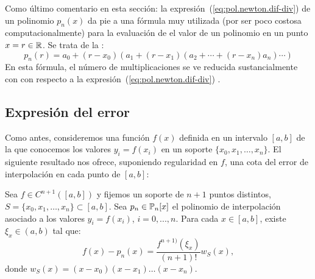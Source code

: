 Como último comentario en esta sección: la
expresión~(\ref{eq:pol.newton.dif-div}) de un polinomio $p_n(x)$ da
pie a una fórmula muy utilizada (por ser poco costosa
computacionalmente) para la evaluación de el valor de un polinomio en un punto $x=r\in\operatorname{{\mathbb R}}$. Se trata de la :
\begin{equation*}
  p_n(r) = a_0 + (r-x_0)(a_1 + (r-x_1)(a_2 + \cdots + (r-x_n)a_n)\cdots)
\end{equation*}
En esta fórmula, el número de multiplicaciones se ve reducida
sustancialmente con con respecto a la
expresión~(\ref{eq:pol.newton.dif-div}) .


\subsection{Expresión del error}
\label{sec:error-interpol-lagrange}
Como antes, consideremos una función $f(x)$ definida en un intervalo
$[a,b]$ de la que conocemos los valores $y_i=f(x_i)$ en un soporte
$\{x_0,x_1,\dots,x_n\}$. El siguiente resultado nos ofrece, suponiendo
regularidad en $f$, una cota del error de interpolación en cada punto
de $[a,b]$:
\begin{theorem}
  \label{thm:error-interpol-lagrange}
  Sea $f\in C^{n+1}([a,b])$ y fijemos un soporte de $n+1$ puntos
  distintos, $S=\{x_0,x_1,\dots,x_n\}\subset[a,b]$. Sea
  $p_n\in\operatorname{{\mathbb P}}_n[x]$ el polinomio de interpolación asociado a los valores
  $y_i=f(x_i)$, $i=0,...,n$. Para cada $x\in[a,b]$, existe $\xi_x\in
  (a,b)$ tal que:
  \begin{equation}
    \label{eq:expresion-error-interpol}
    f(x)-p_n(x)=\frac{f^{n+1)}(\xi_x)}{(n+1)!} w_S(x),
  \end{equation}
  donde $w_S(x)=(x-x_0)(x-x_1)\dots(x-x_n).$
\end{theorem}

